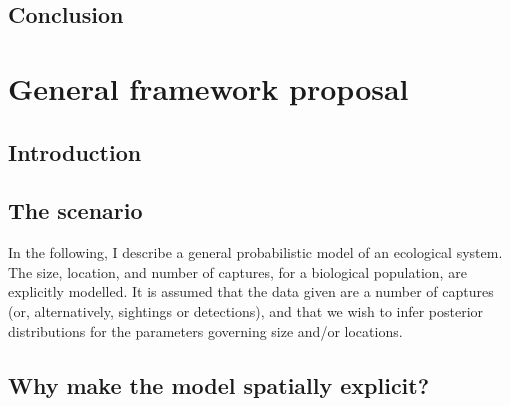 \documentclass[
  oneside]{book}
\begin{document}
\hypertarget{conclusion}{%
\section{Conclusion}\label{conclusion}}

\hypertarget{ch3}{%
\chapter{General framework proposal}\label{ch3}}

\hypertarget{introduction-2}{%
\section{Introduction}\label{introduction-2}}

\hypertarget{the-scenario}{%
\section{The scenario}\label{the-scenario}}

In the following, I describe a general probabilistic model of an ecological system. The size, location, and number of captures, for a biological population, are explicitly modelled. It is assumed that the data given are a number of captures (or, alternatively, sightings or detections), and that we wish to infer posterior distributions for the parameters governing size and/or locations.

\hypertarget{why-make-the-model-spatially-explicit}{%
\section{Why make the model spatially explicit?}\label{why-make-the-model-spatially-explicit}}
\end{document}
